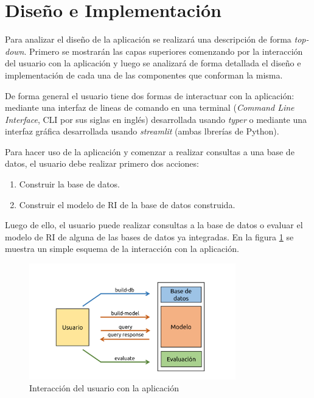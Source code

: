 \section{Diseño e Implementación}\label{sec:design}

Para analizar el diseño de la aplicación se realizará una descripción de forma
\emph{top-down}. Primero se mostrarán las capas superiores comenzando por la
interacción del usuario con la aplicación y luego se analizará de forma
detallada el diseño e implementación de cada una de las componentes que
conforman la misma.

De forma general el usuario tiene dos formas de interactuar con la aplicación:
mediante una interfaz de lineas de comando en una terminal (\emph{Command Line
Interface}, CLI por sus siglas en inglés) desarrollada usando \emph{typer} o
mediante una interfaz gráfica desarrollada usando \emph{streamlit} (ambas
lbrerías de Python).

Para hacer uso de la aplicación y comenzar a realizar consultas a una base de
datos, el usuario debe realizar primero dos acciones:

\begin{enumerate}
	\item Construir la base de datos.
	\item Construir el modelo de RI de la base de datos construida.
\end{enumerate}

Luego de ello, el usuario puede realizar consultas a la base de datos o
evaluar el modelo de RI de alguna de las bases de datos ya integradas. En
la figura \ref{fig:interaction} se muestra un simple esquema de la
interacción con la aplicación.

\begin{figure}[htb]%
	\begin{center}
		\includegraphics[width=0.8\textwidth]{./sri_01.png}
	\end{center}
	\caption{Interacción del usuario con la aplicación}
	\label{fig:interaction}
\end{figure}


